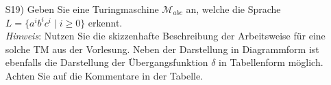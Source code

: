 
\begin{exercise}
\begin{enumerate}
	\item[S19)] Geben Sie eine Turingmaschine $\mathcal{M}_{abc}$ an, welche die Sprache $L=\{a^ib^ic^i \mid i\ge 0\}$ erkennt.\\[0.2cm]
    {\textit{Hinweis}}: Nutzen Sie die skizzenhafte Beschreibung der Arbeitsweise f\"ur eine solche TM aus der Vorlesung. Neben der Darstellung in Diagrammform ist ebenfalls die Darstellung der \"Ubergangsfunktion $\delta$ in Tabellenform m\"oglich. Achten Sie auf die Kommentare in der Tabelle. 
\end{enumerate}
\end{exercise}
